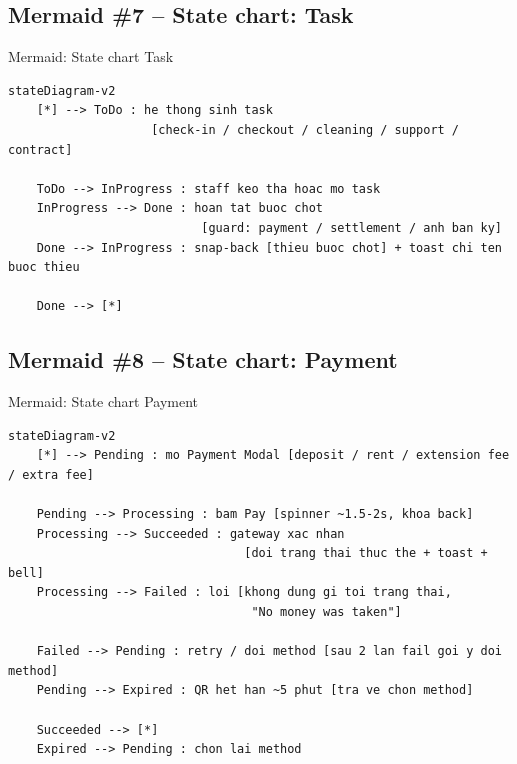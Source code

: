 \documentclass[12pt,a4paper]{article}
\renewcommand{\_}{\textunderscore\allowbreak}
\begin{document}
\subsection{Mermaid \#7 -- State chart: Task}

\begin{mermaidbox}{Mermaid: State chart Task}
\begin{Verbatim}[fontsize=\small]
%% StorageHub - State chart: vong doi Task (kanban)
stateDiagram-v2
    [*] --> ToDo : he thong sinh task
                    [check-in / checkout / cleaning / support / contract]

    ToDo --> InProgress : staff keo tha hoac mo task
    InProgress --> Done : hoan tat buoc chot
                           [guard: payment / settlement / anh ban ky]
    Done --> InProgress : snap-back [thieu buoc chot] + toast chi ten buoc thieu

    Done --> [*]
\end{Verbatim}
\end{mermaidbox}

\subsection{Mermaid \#8 -- State chart: Payment}

\begin{mermaidbox}{Mermaid: State chart Payment}
\begin{Verbatim}[fontsize=\small]
%% StorageHub - State chart: vong doi Payment (mock gateway, 4 touchpoint)
stateDiagram-v2
    [*] --> Pending : mo Payment Modal [deposit / rent / extension fee / extra fee]

    Pending --> Processing : bam Pay [spinner ~1.5-2s, khoa back]
    Processing --> Succeeded : gateway xac nhan
                                 [doi trang thai thuc the + toast + bell]
    Processing --> Failed : loi [khong dung gi toi trang thai,
                                  "No money was taken"]

    Failed --> Pending : retry / doi method [sau 2 lan fail goi y doi method]
    Pending --> Expired : QR het han ~5 phut [tra ve chon method]

    Succeeded --> [*]
    Expired --> Pending : chon lai method
\end{Verbatim}
\end{mermaidbox}
\end{document}
